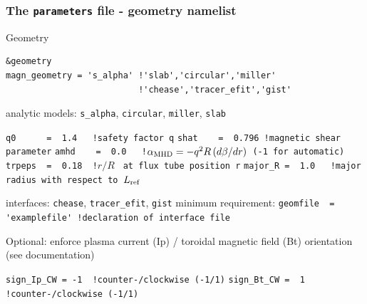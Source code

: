 \documentclass[9pt]{beamer}
\begin{document}
\begin{frame}[fragile]
  \frametitle{The {\tt parameters} file - geometry namelist}


\begin{block}{Geometry}
\vspace{-1ex}
\begin{block}

\begin{verbatim}
&geometry
magn_geometry = 's_alpha' !'slab','circular','miller'
                          !'chease','tracer_efit','gist'
\end{verbatim}
\end{block}
\vspace{-1ex}
\begin{block}{analytic models: {\tt s\_alpha}, {\tt circular}, {\tt miller}, {\tt slab}}

\verb|q0      =  1.4   !safety factor q|
\verb|shat    =  0.796 !magnetic shear parameter|
\verb|amhd    =  0.0   !|${\alpha_{\rm MHD}=-q^2R\,(d\beta/dr)}$\verb| (-1 for automatic)|
\verb|trpeps  =  0.18  !|$r/R$ \verb| at flux tube position r|
\verb|major_R =  1.0   !major radius with respect to |$L_{\rm ref}$
\end{block}
\vspace{-1ex}
\begin{block}{interfaces: {\tt chease}, {\tt tracer\_efit}, {\tt gist}}
minimum requirement:
\verb|geomfile  =  'examplefile' !declaration of interface file|
\end{block}
\vspace{-1ex}
\begin{block}{Optional: enforce plasma current (Ip) / toroidal magnetic field (Bt) orientation (see documentation)}

\verb|sign_Ip_CW = -1  !counter-/clockwise (-1/1)|
\verb|sign_Bt_CW =  1  !counter-/clockwise (-1/1)|
\end{block}

\end{block}

\end{frame}

\end{document}
